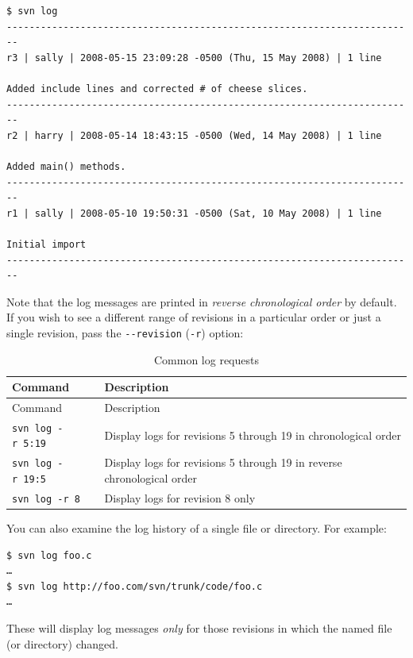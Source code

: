 \begin{verbatim}
$ svn log
------------------------------------------------------------------------
r3 | sally | 2008-05-15 23:09:28 -0500 (Thu, 15 May 2008) | 1 line

Added include lines and corrected # of cheese slices.
------------------------------------------------------------------------
r2 | harry | 2008-05-14 18:43:15 -0500 (Wed, 14 May 2008) | 1 line

Added main() methods.
------------------------------------------------------------------------
r1 | sally | 2008-05-10 19:50:31 -0500 (Sat, 10 May 2008) | 1 line

Initial import
------------------------------------------------------------------------
\end{verbatim}

Note that the log messages are printed in \emph{reverse chronological
order} by default. If you wish to see a different range of revisions in
a particular order or just a single revision, pass the
\texttt{-\/-revision} (\texttt{-r}) option:

\begin{longtable}[]{@{}>{\raggedright\arraybackslash}p{}>{\raggedright\arraybackslash}p{}@{}}
\caption{Common log
requests}\label{svn.tour.history.log.tbl-1}\tabularnewline
\toprule\noalign{}
Command & Description \\
\midrule\noalign{}
\endfirsthead
\toprule\noalign{}
Command & Description \\
\midrule\noalign{}
\endhead
\bottomrule\noalign{}
\endlastfoot
\texttt{svn\ log\ -r\ 5:19} & Display logs for revisions 5 through 19 in
chronological order \\
\texttt{svn\ log\ -r\ 19:5} & Display logs for revisions 5 through 19 in
reverse chronological order \\
\texttt{svn\ log\ -r\ 8} & Display logs for revision 8 only \\
\end{longtable}

You can also examine the log history of a single file or directory. For
example:

\begin{verbatim}
$ svn log foo.c
…
$ svn log http://foo.com/svn/trunk/code/foo.c
…
\end{verbatim}

These will display log messages \emph{only} for those revisions in which
the named file (or directory) changed.

